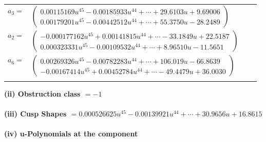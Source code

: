 \documentclass[1p]{elsarticle_modified}
\theoremstyle{definition}
\begin{document}
\begin{tabular}{m{7pt} m{180pt} m{7pt} m{180pt} }
\flushright $a_{3}=$&$\begin{pmatrix}0.00115169 u^{45}-0.00185933 u^{44}+\cdots+29.6103 u+9.69006\\0.00179201 u^{45}-0.00442512 u^{44}+\cdots+55.3750 u-28.2489\end{pmatrix}$ \\
\flushright $a_{2}=$&$\begin{pmatrix}-0.000177162 u^{45}+0.00141815 u^{44}+\cdots-33.1849 u+22.5187\\0.000323331 u^{45}-0.00109532 u^{44}+\cdots+8.96510 u-11.5651\end{pmatrix}$ \\
\flushright $a_{6}=$&$\begin{pmatrix}0.00269326 u^{45}-0.00782283 u^{44}+\cdots+106.019 u-66.8639\\-0.00167414 u^{45}+0.00452784 u^{44}+\cdots-49.4479 u+36.0030\end{pmatrix}$\\&\end{tabular}
\flushleft \textbf{(ii) Obstruction class $= -1$}\\~\\
\flushleft \textbf{(iii) Cusp Shapes $= 0.000526625 u^{45}-0.00139921 u^{44}+\cdots+30.9656 u+16.8615$}\\~\\
\newpage\renewcommand{\arraystretch}{1}
\flushleft \textbf{(iv) u-Polynomials at the component}\newline \\
\end{document}
